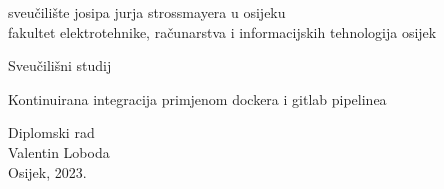 \documentclass[a4paper,12pt,oneside]{article}
\begin{document}

\setcounter{MaxMatrixCols}{20}                          %
\renewcommand{\baselinestretch}{1.5}                    %
\renewcommand{\thefigure}{\thesection.\arabic{figure}}  %
\renewcommand{\thetable}{\thesection.\arabic{table}}   %
\renewcommand{\theequation}{\thesection-\arabic{equation}} %
\renewcommand{\refname}{Literatura}						%






\begin{titlepage}

\begin{center}{\sc\Large sveu\v{c}ili\v{s}te josipa jurja strossmayera u osijeku}\\{\sc\Large fakultet elektrotehnike, ra\v{c}unarstva i informacijskih tehnologija osijek}\\
\bigskip

\vspace*{2cm}
{\large Sveučilišni studij}\\

\vspace*{7cm}

{\sc\LARGE Kontinuirana integracija primjenom dockera i gitlab pipelinea}

\vspace*{1cm}
{\large Diplomski rad}\\
\vspace*{3cm}
{\Large Valentin Loboda}\\
\vspace*{6cm}
{\normalsize Osijek, 2023.}
\end{center}

\end{titlepage}
\end{document}
